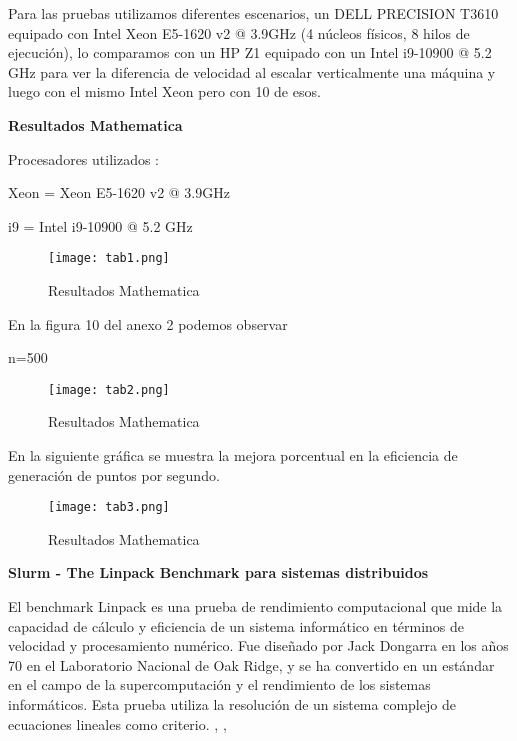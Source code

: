 \begin{spacing}{1.5}
      Para las pruebas utilizamos diferentes escenarios, un DELL PRECISION T3610 equipado con Intel Xeon E5-1620 v2 @ 3.9GHz (4 núcleos físicos, 8 hilos de ejecución), lo comparamos con un HP Z1 equipado con un Intel i9-10900 @ 5.2 GHz para ver la diferencia de velocidad al escalar verticalmente una máquina y luego con el mismo Intel Xeon pero con 10 de esos.

      \textbf{Resultados Mathematica}

      Procesadores utilizados : 

      Xeon = Xeon E5-1620 v2 @ 3.9GHz 

      i9 = Intel i9-10900 @ 5.2 GHz

      \begin{figure}[h]
            \centering
            \texttt{[image: tab1.png]}
            \caption{Resultados Mathematica}
            \label{fig:etiqueta}
          \end{figure}

      En la figura 10 del anexo 2 podemos observar

      n=500

      \begin{figure}[h]
            \centering
            \texttt{[image: tab2.png]}
            \caption{Resultados Mathematica}
            \label{fig:etiqueta}
      \end{figure}

      En la siguiente gráfica se muestra la mejora porcentual en la eficiencia de generación de puntos por segundo.

      \begin{figure}[h]
            \centering
            \texttt{[image: tab3.png]}
            \caption{Resultados Mathematica}
            \label{fig:etiqueta}
      \end{figure}

\textbf{Slurm - The Linpack Benchmark para sistemas distribuidos}

El benchmark Linpack es una prueba de rendimiento computacional que mide la capacidad de cálculo y eficiencia de un sistema informático en términos de velocidad y procesamiento numérico. Fue diseñado por Jack Dongarra en los años 70 en el Laboratorio Nacional de Oak Ridge, y se ha convertido en un estándar en el campo de la supercomputación y el rendimiento de los sistemas informáticos. Esta prueba utiliza la resolución de un sistema complejo de ecuaciones lineales como criterio. \cite{linpack}, \cite{hpl-linpack}, \cite{faq-linpack}


\end{spacing}
